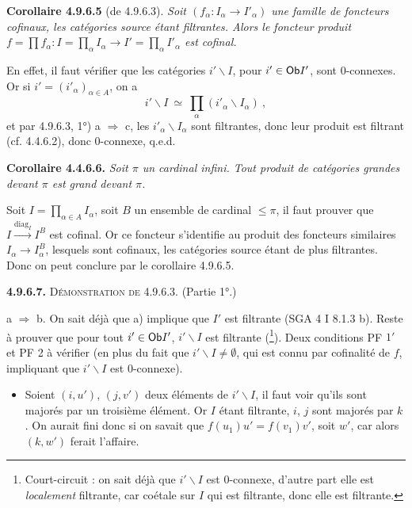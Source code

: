\textbf{Corollaire 4.9.6.5} (de 4.9.6.3). \textit{Soit $(f_\alpha : I_\alpha \longrightarrow I'_\alpha)$ une famille de foncteurs cofinaux, les catégories source étant filtrantes. Alors le foncteur produit $f = \prod f_\alpha : I = \prod_\alpha I_\alpha \longrightarrow I' = \prod_\alpha I'_\alpha$ est cofinal.}

En effet, il faut vérifier que les catégories $i'\backslash I$, pour $i' \in \mathsf{Ob} I'$, sont 0-connexes. Or si $i' = (i'_\alpha)_{\alpha \in A}$, on a
\[
i'\backslash I \ \simeq \ \prod_\alpha (i'_\alpha\backslash I_\alpha) \ ,
\]
et par 4.9.6.3, 1°) a $\Longrightarrow$ c, les $i'_\alpha\backslash I_\alpha$ sont filtrantes, donc leur produit est filtrant
(cf. 4.4.6.2), donc 0-connexe, q.e.d. %

\textbf{Corollaire 4.4.6.6.} \textit{Soit $\pi$ un cardinal infini. Tout produit de catégories grandes devant $\pi$ est grand devant $\pi$.} %

Soit $I = \prod_{\alpha \in A} I_\alpha$, soit $B$ un ensemble de cardinal $\leqslant \pi$, il faut prouver que $I \xrightarrow{\mathrm{diag}_I} I^B$ est cofinal. Or ce foncteur s'identifie au produit des foncteurs similaires $I_\alpha \longrightarrow I_\alpha^B$, lesquels sont cofinaux, les catégories source étant de plus filtrantes. Donc on peut conclure par le corollaire 4.9.6.5.

\textbf{4.9.6.7.} \textsc{Démonstration de} 4.9.6.3. (Partie 1°.)

a $\Longrightarrow$ b. On sait déjà que a) implique que $I'$ est filtrante (SGA 4 I 8.1.3 b). Reste à prouver que pour tout $i' \in \mathsf{Ob} I'$, $i'\backslash I$ est filtrante (\footnote[103]{Court-circuit : on sait déjà que $i'\backslash I$ est 0-connexe, d'autre part elle est \textit{localement} filtrante, car coétale sur $I$ qui est filtrante, donc elle est filtrante.}). Deux conditions PF $1'$ et PF 2 à vérifier (en plus du fait que $i'\backslash I \neq \emptyset$, qui est connu par cofinalité de $f$, impliquant que $i'\backslash I$ est 0-connexe).
\begin{itemize}[label={}]
\item[1)] Soient $(i,u')$, $(j,v')$ deux éléments de $i'\backslash I$, il faut voir qu'ils sont majorés par un troisième élément. Or $I$ étant filtrante, $i$, $j$ sont majorés par $k$. On aurait fini donc si on savait que $f(u_1)u' = f(v_1)v'$, soit $w'$, car alors $(k,w')$ ferait l'affaire.
\end{itemize}


